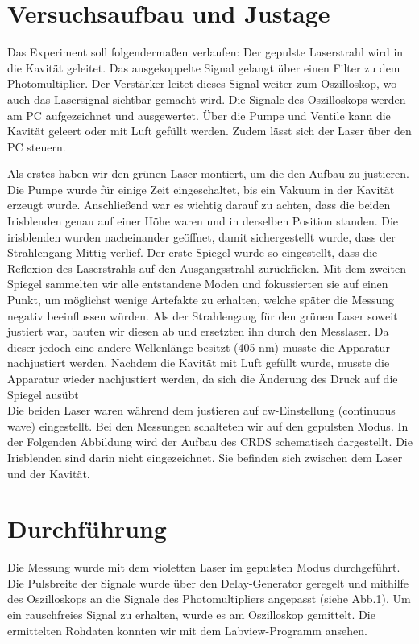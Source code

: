 \section{Versuchsaufbau und Justage}

Das Experiment soll folgendermaßen verlaufen: Der gepulste Laserstrahl wird in die Kavität geleitet. Das ausgekoppelte Signal gelangt über einen Filter zu dem Photomultiplier. Der Verstärker leitet dieses Signal weiter zum Oszilloskop, wo auch das Lasersignal sichtbar gemacht wird. Die Signale des Oszilloskops werden am PC aufgezeichnet und ausgewertet. Über die Pumpe und Ventile kann die Kavität geleert oder mit Luft gefüllt werden. Zudem lässt sich der Laser über den PC steuern.

Als erstes haben wir den grünen Laser montiert, um die den Aufbau zu justieren. Die Pumpe wurde für einige Zeit eingeschaltet, bis ein Vakuum in der Kavität erzeugt wurde. Anschließend war es wichtig darauf zu achten, dass die beiden Irisblenden genau auf einer Höhe waren und in derselben Position standen. Die irisblenden wurden nacheinander geöffnet, damit sichergestellt wurde, dass der Strahlengang Mittig verlief. Der erste Spiegel wurde so eingestellt, dass die Reflexion des Laserstrahls auf den Ausgangsstrahl zurückfielen. Mit dem zweiten Spiegel sammelten wir alle entstandene Moden und fokussierten sie auf einen Punkt, um möglichst wenige Artefakte zu erhalten, welche später die Messung negativ beeinflussen würden. Als der Strahlengang für den grünen Laser soweit justiert war, bauten wir diesen ab und ersetzten ihn durch den Messlaser. Da dieser jedoch eine andere Wellenlänge besitzt (405 nm) musste die Apparatur nachjustiert werden. Nachdem die Kavität mit Luft gefüllt wurde, musste die Apparatur wieder nachjustiert werden, da sich die Änderung des Druck auf die Spiegel ausübt\\
Die beiden Laser waren während dem justieren auf cw-Einstellung (continuous wave) eingestellt. Bei den Messungen schalteten wir auf den gepulsten Modus. In der Folgenden Abbildung wird der Aufbau des CRDS schematisch dargestellt. Die Irisblenden sind darin nicht eingezeichnet. Sie befinden sich zwischen dem Laser und der Kavität.



\section{Durchführung}
Die Messung wurde mit dem violetten Laser im gepulsten Modus durchgeführt. Die Pulsbreite der Signale wurde über den Delay-Generator geregelt und mithilfe des Oszilloskops an die Signale des Photomultipliers angepasst (siehe Abb.1). Um ein rauschfreies Signal zu erhalten, wurde es am Oszilloskop gemittelt. Die ermittelten Rohdaten konnten wir mit dem Labview-Programm ansehen. 

